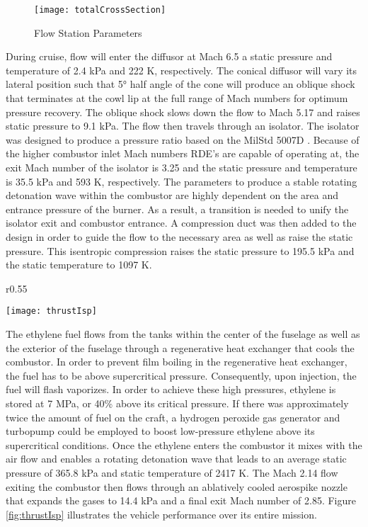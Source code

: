 \begin{figure}[H]
\begin{center}
\texttt{[image: totalCrossSection]}
\caption{Flow Station Parameters}
\label{fig:totalCrossSection}
\end{center}
\end{figure}

During cruise, flow will enter the diffusor at Mach 6.5 a static pressure and temperature of 2.4 kPa and 222 K, respectively. The conical diffusor will vary its lateral position such that \ang{5} half angle of the cone will produce an oblique shock that terminates at the cowl lip at the full range of Mach numbers for optimum pressure recovery. The oblique shock slows down the flow to Mach 5.17 and raises static pressure to 9.1 kPa. The flow then travels through an isolator. The isolator was designed to produce a pressure ratio based on the MilStd 5007D \cite{milstd5007D}. Because of the higher combustor inlet Mach numbers RDE’s are capable of operating at, the exit Mach number of the isolator is 3.25 and the static pressure and temperature is 35.5 kPa and 593 K, respectively. The parameters to produce a stable rotating detonation wave within the combustor are highly dependent on the area and entrance pressure of the burner. As a result, a transition is needed to unify the isolator exit and combustor entrance. A compression duct was then added to the design in order to guide the flow to the necessary area as well as raise the static pressure. This isentropic compression raises the static pressure to 195.5 kPa and the static temperature to 1097 K.

\begin{wrapfigure}{r}{0.55\textwidth}
\begin{center}
\texttt{[image: thrustIsp]}
\caption{Thrust and Isp v. Time}
\label{fig:thrustIsp}
\end{center}
\end{wrapfigure}

        	The ethylene fuel flows from the tanks within the center of the fuselage as well as the exterior of the fuselage through a regenerative heat exchanger that cools the combustor. In order to prevent film boiling in the regenerative heat exchanger, the fuel has to be above supercritical pressure. Consequently, upon injection, the fuel will flash vaporizes. In order to achieve these high pressures, ethylene is stored at 7 MPa, or 40\% above its critical pressure. If there was approximately twice the amount of fuel on the craft, a hydrogen peroxide gas generator and turbopump could be employed to boost low-pressure ethylene above its supercritical conditions. Once the ethylene enters the combustor it mixes with the air flow and enables a rotating detonation wave that leads to an average static pressure of 365.8 kPa and static temperature of 2417 K. The Mach 2.14 flow exiting the combustor then flows through an ablatively cooled aerospike nozzle that expands the gases to 14.4 kPa and a final exit Mach number of 2.85. Figure \ref{fig:thrustIsp} illustrates the vehicle performance over its entire mission.
